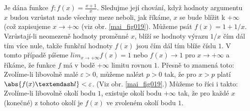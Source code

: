 \wikitextrule
\begin{example}\label{MAI:exam031}
  Je dána funkce \(f: f(x) = \frac{x + 1}{x}\). Sledujme její chování, když hodnoty argumentu \(x\) 
  budou vzrůstat 
  nade všechny meze neboli, jak říkáme, \(x\) se bude blížit k \(+\infty\) (což zapisujeme \(x \to 
  + \infty\) (viz obr. \ref{mai_fig019}). Můžeme psát \(f(x) = 1 + 1/x\). Vzrůstají-li neomezeně 
  hodnoty proměnné \(x\), blíží se hodnoty výrazu \(1/x\) čím dál tím více nule, takže funkční 
  hodnoty \(f(x)\) jsou čím dál tím blíže číslu \(1\). V tomto případě píšeme \(lim_{x\to+\infty} 
  f(x) = 1\) nebo \(f(x) \to 1\) pro \(x\to +\infty\) a říkáme, že funkce \(f\) má v bodě 
  \(+\infty\) limitu rovnou \(1\). Přesně to znamená toto: Zvolíme-li libovolně malé \(\varepsilon 
  > 0\), můžeme nalézt \(p > 0\) tak, že pro \(x > p\) platí \(\abs{f(x) — l} < \varepsilon\). (Viz 
  obr. \ref{mai_fig019}.) Můžeme to říci i takto: Zvolíme-li libovolně okolí bodu \(1\), existuje 
  okolí bodu \(+\infty\) tak, že pro každé \(x\) (konečné) z tohoto okolí je \(f(x)\) ve zvoleném 
  okolí bodu \(1\).
  
  {\centering
   \captionsetup{type=figure}
   
  \par}
\end{example}
















